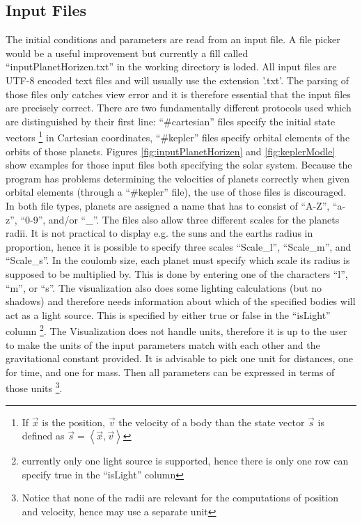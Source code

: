 \documentclass[a4paper,onesided,10pt]{article}
\begin{document}
\subsection{Input Files}
The initial conditions and parameters are read from an input file. A file picker would be a useful improvement but currently a fill called "`inputPlanetHorizen.txt"' in the working directory is loded. All input files are UTF-8 encoded text files and will usually use the extension '.txt'. The parsing of those files only catches view error and it is therefore essential that the input files are precisely correct. There are two fundamentally different protocols used which are distinguished by their first line: "`\#cartesian"' files specify the initial state vectors \footnote{If $\vec{x}$ is the position, $\vec{v}$ the velocity of a body than the state vector $\vec{s}$ is defined as $\vec{s} = \left\langle \vec{x}, \vec{v} \right\rangle$} in Cartesian coordinates, "`\#kepler"' files specify orbital elements of the orbits of those planets. Figures \ref{fig:inputPlanetHorizen} and \ref{fig:keplerModle} show examples for those input files both specifying the solar system. Because the program has problems determining the velocities of planets correctly when given orbital elements (through a "`\#kepler"' file), the use of those files is discouraged. In both file types, planets are assigned a name that has to consist of "`A-Z"', "`a-z"', "`0-9"', and/or "`\_"'. The files also allow three different scales for the planets radii. It is not practical to display e.g. the suns and the earths radius in proportion, hence it is possible to specify three scales "`Scale\_l"', "`Scale\_m"', and "`Scale\_s"'. In the coulomb size, each planet must specify which scale its radius is supposed to be multiplied by. This is done by entering one of the characters "`l"', "`m"', or "`s"'. The visualization also does some lighting calculations (but no shadows) and therefore needs information about which of the specified bodies will act as a light source. This is specified by either true or false in the "`isLight"' column \footnote{currently only one light source is supported, hence there is only one row can specify true in the "`isLight"' column}. The Visualization does not handle units, therefore it is up to the user to make the units of the input parameters match with each other and the gravitational constant provided. It is advisable to pick one unit for distances, one for time, and one for mass. Then all parameters can be expressed in terms of those units \footnote{Notice that none of the radii are relevant for the computations of position and velocity, hence may use a separate unit}. 
\end{document}
